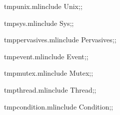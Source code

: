 \documentclass[oneside,a4paper,11pt]{memoir}
\title{\mytitle}
\author{\myauthors}
\date{\today}
\begin{document}
\pagestyle{empty}
\renewcommand{\abstractname}{概要}


\frontmatter
\pagestyle{myheaders}

\renewcommand{\contentsname}{目次}
\ifhtmlelse%
{\tableofcontents{}}%
{\tableofcontents}

\mainmatter
{} %











\backmatter




\appendix

\renewcommand{\preindexhook} {
  \ifhtml{\aname{htocindex}{}} %
  ボールド体のリンクは \textsc{posix} システムコールの説明へのリンクです。
  \ifnothtml{\medskip}}

\renewcommand{\indexname}{索引}
\printindex
{}

\pagestyle{empty}
\newpage
\mbox{}

\begin{codefile}{tmpunix.ml}include Unix;;\end{codefile}
\begin{codefile}{tmpsys.ml}include Sys;;\end{codefile}
\begin{codefile}{tmppervasives.ml}include Pervasives;;\end{codefile}
\begin{codefile}{tmpevent.ml}include Event;;\end{codefile}
\begin{codefile}{tmpmutex.ml}include Mutex;;\end{codefile}
\begin{codefile}{tmpthread.ml}include Thread;;\end{codefile}
\begin{codefile}{tmpcondition.ml}include Condition;;\end{codefile}
\end{document}
